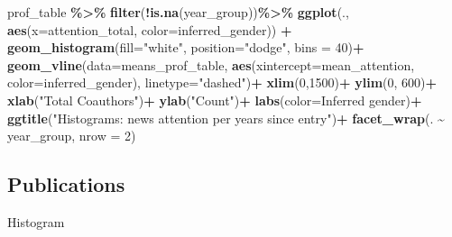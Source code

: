 \documentclass[
]{article}
\newenvironment{Shaded}{\begin{snugshade}}{\end{snugshade}}
\newcommand{\AttributeTok}[1]{\textcolor[rgb]{0.13,0.29,0.53}{#1}}
\newcommand{\DecValTok}[1]{\textcolor[rgb]{0.00,0.00,0.81}{#1}}
\newcommand{\FunctionTok}[1]{\textcolor[rgb]{0.13,0.29,0.53}{\textbf{#1}}}
\newcommand{\NormalTok}[1]{#1}
\newcommand{\SpecialCharTok}[1]{\textcolor[rgb]{0.81,0.36,0.00}{\textbf{#1}}}
\newcommand{\StringTok}[1]{\textcolor[rgb]{0.31,0.60,0.02}{#1}}
\begin{document}
\begin{Shaded}
\begin{Highlighting}[]
\NormalTok{prof\_table }\SpecialCharTok{\%\textgreater{}\%}
  \FunctionTok{filter}\NormalTok{(}\SpecialCharTok{!}\FunctionTok{is.na}\NormalTok{(year\_group))}\SpecialCharTok{\%\textgreater{}\%}
\FunctionTok{ggplot}\NormalTok{(., }\FunctionTok{aes}\NormalTok{(}\AttributeTok{x=}\NormalTok{attention\_total, }\AttributeTok{color=}\NormalTok{inferred\_gender)) }\SpecialCharTok{+}
  \FunctionTok{geom\_histogram}\NormalTok{(}\AttributeTok{fill=}\StringTok{"white"}\NormalTok{, }\AttributeTok{position=}\StringTok{"dodge"}\NormalTok{, }\AttributeTok{bins =} \DecValTok{40}\NormalTok{)}\SpecialCharTok{+}
  \FunctionTok{geom\_vline}\NormalTok{(}\AttributeTok{data=}\NormalTok{means\_prof\_table, }\FunctionTok{aes}\NormalTok{(}\AttributeTok{xintercept=}\NormalTok{mean\_attention, }\AttributeTok{color=}\NormalTok{inferred\_gender),}
             \AttributeTok{linetype=}\StringTok{"dashed"}\NormalTok{)}\SpecialCharTok{+}
  \FunctionTok{xlim}\NormalTok{(}\DecValTok{0}\NormalTok{,}\DecValTok{1500}\NormalTok{)}\SpecialCharTok{+}
  \FunctionTok{ylim}\NormalTok{(}\DecValTok{0}\NormalTok{, }\DecValTok{600}\NormalTok{)}\SpecialCharTok{+}
  \FunctionTok{xlab}\NormalTok{(}\StringTok{"Total Coauthors"}\NormalTok{)}\SpecialCharTok{+}
  \FunctionTok{ylab}\NormalTok{(}\StringTok{"Count"}\NormalTok{)}\SpecialCharTok{+}
  \FunctionTok{labs}\NormalTok{(}\AttributeTok{color=}\StringTok{\textquotesingle{}Inferred gender\textquotesingle{}}\NormalTok{)}\SpecialCharTok{+}
  \FunctionTok{ggtitle}\NormalTok{(}\StringTok{"Histograms: news attention per years since entry"}\NormalTok{)}\SpecialCharTok{+}
  \FunctionTok{facet\_wrap}\NormalTok{(. }\SpecialCharTok{\textasciitilde{}}\NormalTok{ year\_group, }\AttributeTok{nrow =} \DecValTok{2}\NormalTok{)}
\end{Highlighting}
\end{Shaded}

\hypertarget{publications}{%
\subsection{Publications}\label{publications}}

Histogram
\end{document}

